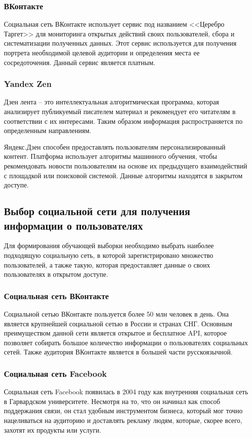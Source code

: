 \subsubsection{ВКонтакте}
Социальная сеть ВКонтакте использует сервис под названием <<Церебро Таргет>> для мониторинга открытых действий своих пользователей, сбора и систематизации полученных данных. Этот сервис используется для получения портрета необходимой целевой аудитории и определения места ее сосредоточения. Данный сервис является платным.

\subsubsection{Yandex Zen}
Дзен лента – это интеллектуальная алгоритмическая программа, которая анализирует публикуемый писателем материал и рекомендует его читателям в соответствии с их интересами. Таким образом информация распространяется по определенным направлениям. 

Яндекс.Дзен способен предоставлять пользователям персонализированный контент.  Платформа использует алгоритмы машинного обучения, чтобы рекомендовать новости пользователям на основе их предыдущего взаимодействий с площадкой или поисковой системой. Данные алгоритмы находятся в закрытом доступе.

\subsection{Выбор социальной сети для получения информации о пользователях}
Для формирования обучающей выборки необходимо выбрать наиболее подходящую социальную сеть, в которой зарегистрировано множество пользователей, а также такую, которая предоставляет данные о своих пользователях в открытом доступе.

\subsubsection{Социальная сеть ВКонтакте}
Социальной сетью ВКонтакте пользуется более 50 млн человек в день. Она является крупнейшей социальной сетью в России и странах СНГ. Основным преимуществом данной сети является открытое и бесплатное API, которое позволяет собирать большое количество информации о пользователях социальных сетей. Также аудитория ВКонтакте является в большей части русскоязычной.

\subsubsection{Социальная сеть Facebook}
Социальная сеть Facebook появилась в 2004 году как внутренняя социальная сеть в Гарвардском университете. Несмотря на то, что он начинал как способ поддержания связи, он стал удобным инструментом бизнеса, который мог точно нацеливаться на аудиторию и доставлять рекламу людям, которые, скорее всего, захотят их продукты или услуги.

